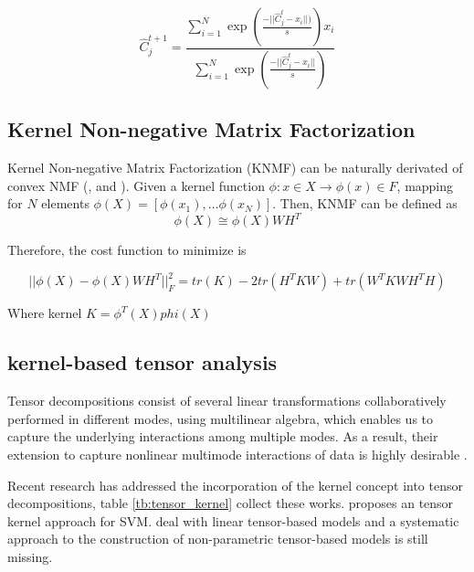 \documentclass[letterpaper,12pt]{article}
\begin{document}
\begin{equation}
\hat{C}_{j}^{t+1}=\frac{\sum_{i=1}^{N}\exp(\frac{-||\hat{C}_{j}^{t}-x_{i}||)}{s})x_{i}}{\sum_{i=1}^{N}\exp(\frac{-||\hat{C}_{j}^{t}-x_{i}||}{s})}\label{eq:back-projection}
\end{equation}

\subsection{Kernel Non-negative Matrix Factorization}\label{sec:kernel_tensor}

Kernel Non-negative Matrix Factorization (KNMF) can be naturally derivated of convex NMF (\cite{Kulis2006}, \cite{Li2005} and \cite{Rosipal2001}). Given a kernel function $\phi:x\in X \rightarrow \phi(x)\in F $, mapping for $N$ elements $\phi(X) = [ \phi(x_1),\ldots \phi(x_N) ]$. Then, KNMF can be defined as
\begin{equation}
 \phi(X)\cong\phi(X)WH^T
\end{equation}\label{eq:KNMF}

Therefore, the cost function to minimize is

\begin{equation}
 || \phi(X) - \phi(X)WH^T ||_F^2 = tr(K) - 2 tr(H^TKW)+tr(W^TKWH^TH)
\end{equation}

 Where kernel $K=\phi^T(X)phi(X)$
 

\subsection{kernel-based tensor analysis}\label{sec:kerne_tensor}

Tensor decompositions consist of several linear transformations collaboratively performed in different modes, using multilinear algebra, which enables us to capture the underlying interactions among multiple modes. As a result, their extension to capture nonlinear multimode interactions of data is highly desirable \cite{Zhao2013}.%

Recent research has addressed the incorporation of the kernel concept into tensor decompositions, table \ref{tb:tensor_kernel} collect these works. \cite{Hardoon2010} proposes an tensor kernel approach for SVM. \cite{Signoretto2011} deal with linear tensor-based models and a systematic approach to the construction of non-parametric tensor-based models is still missing. 
\end{document}
